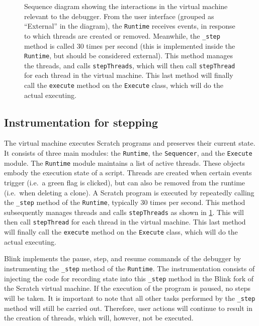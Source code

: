 \documentclass[../main]{subfiles}
\begin{document}
\begin{figure}
    \centering
    
    \caption{
        Sequence diagram showing the interactions in the virtual machine relevant to the debugger.
        From the user interface (grouped as ``External'' in the diagram), the \texttt{Runtime} receives events, in response to which threads are created or removed.
        Meanwhile, the \texttt{\_step} method is called 30 times per second (this is implemented inside the \texttt{Runtime}, but should be considered external).
        This method manages the threads, and calls \texttt{stepThreads}, which will then call \texttt{stepThread} for each thread in the virtual machine.
        This last method will finally call the \texttt{execute} method on the \texttt{Execute} class, which will do the actual executing.
    }
    \label{fig:blink-architecture}
\end{figure}

\subsection{Instrumentation for stepping}\label{subsec:instrumentation-for-stepping}

The virtual machine executes Scratch programs and preserves their current state.
It consists of three main modules: the \texttt{Runtime}, the \texttt{Sequencer}, and the \texttt{Execute} module.
The \texttt{Runtime} module maintains a list of active threads.
These objects embody the execution state of a script.
Threads are created when certain events trigger (i.e.\ a green flag is clicked), but can also be removed from the runtime (i.e.\ when deleting a clone).
A Scratch program is executed by repeatedly calling the \texttt{\_step} method of the \texttt{Runtime}, typically 30 times per second.
This method subsequently manages threads and calls \texttt{stepThreads} as shown in \cref{fig:blink-architecture}.
This will then call \texttt{stepThread} for each thread in the virtual machine.
This last method will finally call the \texttt{execute} method on the \texttt{Execute} class, which will do the actual executing.

Blink implements the pause, step, and resume commands of the debugger by instrumenting the \texttt{\_step} method of the \texttt{Runtime}.
The instrumentation consists of injecting the code for recording state into this \texttt{\_step} method in the Blink fork of the Scratch virtual machine.
If the execution of the program is paused, no steps will be taken.
It is important to note that all other tasks performed by the \texttt{\_step} method will still be carried out.
Therefore, user actions will continue to result in the creation of threads, which will, however, not be executed.
\end{document}
